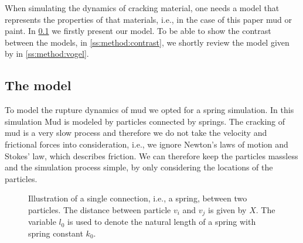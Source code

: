 
When simulating the dynamics of cracking material, one needs a model that represents the properties of that materials, i.e., in the case of this paper mud or paint. In \cref{ss:method:model} we firstly present our model. To be able to show the contrast between the models, in \cref{ss:method:contrast}, we shortly review the model given by \citeauthor{vogel2005studies2} in \cref{ss:method:vogel}.

\subsection{The model}\label{ss:method:model}

To model the rupture dynamics of mud we opted for a spring simulation. In this simulation Mud is modeled by particles connected by springs. The cracking of mud is a very slow process and therefore we do not take the velocity and frictional forces into consideration, i.e., we ignore Newton's laws of motion and Stokes' law, which describes friction. We can therefore keep the particles massless and the simulation process simple, by only considering the locations of the particles. 

\begin{figure}
	\centering
	\caption{Illustration of a single connection, i.e., a spring, between two particles. The distance between particle $v_i$ and $v_j$ is given by $X$. The variable $l_0$ is used to denote the natural length of a spring with spring constant $k_0$.}
	\label{fig:method:spring}
\end{figure}

